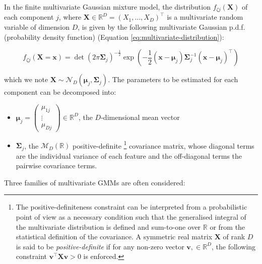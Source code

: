 In the finite multivariate Gaussian mixture model, the distribution \(f_{\zeta j}(\boldsymbol{X})\) of each component \(j\), where
\(\boldsymbol{X} \in \mathbb{R}^D =(X_1, \ldots, X_D)^\top\) is a multivariate random variable
of dimension \(D\), is given by the
following multivariate Gaussian p.d.f. (probability density function)
(Equation \eqref{eq:multivariate-distribution}):

\begin{equation}
    f_{\zeta j}(\boldsymbol{X}=\boldsymbol{x})=\operatorname{det}(2\pi\boldsymbol{\Sigma}_j)^{-\frac{1}{2}} \exp\left( -\frac{1}{2} (\boldsymbol{x} - \boldsymbol{\mu}_j) \boldsymbol{\Sigma}_j^{-1} (\boldsymbol{x} - \boldsymbol{\mu}_j)^\top\right)
\label{eq:multivariate-distribution}
\end{equation}

which we note
\(\boldsymbol{X} \sim \mathcal{N}_D(\boldsymbol{\mu}_j, \boldsymbol{\Sigma}_j)\). The parameters to be estimated for each component can be decomposed into:

\begin{itemize}
\item
  \(\boldsymbol{\mu}_j=\begin{pmatrix} \mu_{1j} \\ \vdots \\ \mu_{Dj} \end{pmatrix} \in \mathbb{R}^D\), the \(D\)-dimensional mean vector
\item
  \(\boldsymbol{\Sigma}_j\), the \(\mathcal{M}_D(\mathbb{R})\) positive-definite \footnote{The positive-definiteness constraint can be interpreted from a probabilistic point of view as a necessary condition such that the generalised integral of the multivariate distribution is defined and sum-to-one over \(\mathbb{R}\) or from the statistical definition of the covariance. A symmetric real matrix \(\boldsymbol{X}\) of rank \(D\) is said to be \textit{positive-definite} if for any non-zero vector
    \(\mathbf{v}, \in \mathbb{R}^D\), the following constraint
    \(\mathbf{v}^\top \boldsymbol{X} \mathbf{v} > 0\) is enforced.} covariance matrix, whose diagonal terms are the individual variance of each feature and the off-diagonal terms the pairwise covariance terms.
\end{itemize}

Three families of multivariate GMMs are often considered:

